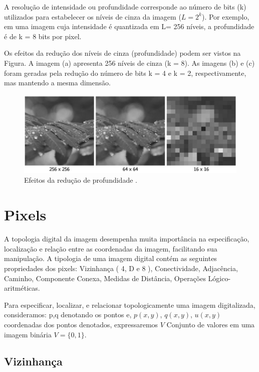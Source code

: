 \documentclass[
  brazilian,
]{book}
\begin{document}
A resolução de intensidade ou profundidade corresponde ao número de bits (k) utilizados para estabelecer os níveis de cinza da imagem (\(L=2^k\)). Por exemplo, em uma imagem cuja intensidade é quantizada em L= 256 níveis, a profundidade é de k = 8 bits por pixel.

Os efeitos da redução dos níveis de cinza (profundidade) podem ser vistos na Figura. A imagem (a) apresenta 256 níveis de cinza (k = 8). As imagens (b) e (c) foram geradas pela redução do número de bits k = 4 e k = 2, respectivamente, mas mantendo a mesma dimensão.



\begin{figure}

{\centering \includegraphics[width=0.9\linewidth]{imagens/02-formacao/reducaoprofundidade} 

}

\caption{Efeitos da redução de profundidade \autocite[p.19]{moeslund2012}.}\label{fig:reducaoprofundidade}
\end{figure}

\hypertarget{pixels}{%
\section{Pixels}\label{pixels}}

A topologia digital da imagem desempenha muita importância na especificação, localização e relação entre as coordenadas da imagem, facilitando sua manipulação. A tipologia de uma imagem digital contém as seguintes propriedades dos pixels: Vizinhança ( 4, D e 8 ), Conectividade, Adjacência, Caminho, Componente Conexa, Medidas de Distância, Operações Lógico-aritméticas.

Para especificar, localizar, e relacionar topologicamente uma imagem digitalizada, consideramos: p,q denotando os pontos e, \(p(x,y)\), \(q(x,y)\), \(u(x,y)\) coordenadas dos pontos denotados, expressaremos \(V\) Conjunto de valores em uma imagem binária \(V=\{0,1\}\).

\hypertarget{vizinhanuxe7a}{%
\subsection{Vizinhança}\label{vizinhanuxe7a}}
\end{document}
